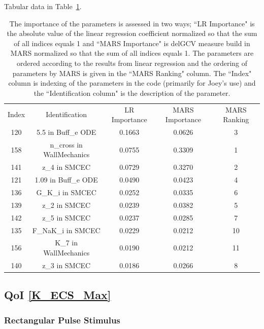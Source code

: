 \documentclass[12pt]{article}
\numberwithin{equation}{section}
\begin{document}
Tabular data in Table~\ref{qoi_vol_flow_ex}.

\begin{table}[h]
\centering
\begin{tabular}{ccccc}
Index & Identification & LR Importance & MARS Importance & MARS Ranking \\
   120 & 5.5 in Buff\_e ODE & 0.1663 & 0.0626 & 3\\
   158 & n\_cross in WallMechanics  & 0.0755 & 0.3309 & 1\\
   141 & z\_4 in SMCEC & 0.0729 & 0.3270 & 2\\
   121 & 1.09 in Buff\_e ODE & 0.0490 & 0.0423 & 4\\
   136 & G\_K\_i in SMCEC & 0.0252 & 0.0335 & 6\\
   139 & z\_2 in SMCEC & 0.0239 & 0.0382 & 5\\
   142 & z\_5 in SMCEC & 0.0237 & 0.0285 & 7\\
   135 & F\_NaK\_i in SMCEC & 0.0229 & 0.0212 & 10\\
   156 & K\_7 in WallMechanics & 0.0190 & 0.0212 & 11\\
   140 & z\_3 in SMCEC & 0.0186 & 0.0266 & 8\\
\end{tabular}
\caption{The importance of the parameters is assessed in two ways; ``LR Importance" is the absolute value of the linear regression coefficient normalized so that the sum of all indices equals 1 and ``MARS Importance" is delGCV measure build in MARS normalized so that the sum of all indices equals 1. The parameters are ordered according to the results from linear regression and the ordering of parameters by MARS is given in the ``MARS Ranking" column. The ``Index" column is indexing of the parameters in the code (primarily for Joey's use) and the ``Identification column" is the description of the parameter.}
\label{qoi_vol_flow_ex}
\end{table}

\newpage

\subsection{QoI \eqref{K_ECS_Max}}

\subsubsection{Rectangular Pulse Stimulus}
\end{document}
